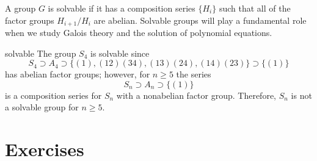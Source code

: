  
\medskip
 
 
A group $G$ is {\bfi solvable\/} if it has 
a composition series $\{ H_i \}$ such that all of the factor groups 
$H_{i+1} / H_i$ are abelian. Solvable groups will play a fundamental 
role when we study Galois theory and the solution of polynomial 
equations. 
 
 
 
\begin{example}{solvable}
The group $S_4$ is solvable since
\[
S_4 \supset A_4 \supset \{ (1), (12)(34), (13)(24), (14)(23) \} 
\supset \{ (1) \}
\]
has abelian factor groups; however, for $n \geq 5$ the series
\[
S_n \supset A_n \supset \{ (1) \}
\]
is a composition series for $S_n$ with a nonabelian factor group.
Therefore, $S_n$ is not a solvable group for $n \geq 5$. 
\end{example}
 
 
 
 
\section*{Exercises}
\exrule
 
 
 
